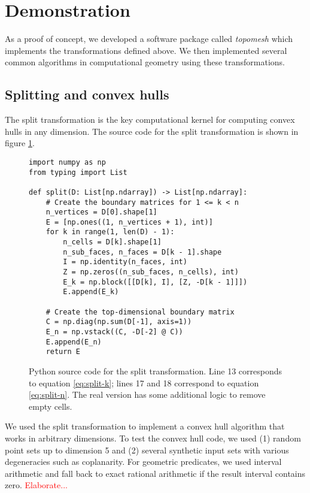 \documentclass[twocolumn]{article}
\begin{document}
\section{Demonstration}

As a proof of concept, we developed a software package called \emph{topomesh} which implements the transformations defined above.
We then implemented several common algorithms in computational geometry using these transformations.

\subsection{Splitting and convex hulls}

The split transformation is the key computational kernel for computing convex hulls in any dimension.
The source code for the split transformation is shown in figure \ref{fig:split-source-code}.
\begin{figure}
    \begin{verbatim}
import numpy as np
from typing import List

def split(D: List[np.ndarray]) -> List[np.ndarray]:
    # Create the boundary matrices for 1 <= k < n
    n_vertices = D[0].shape[1]
    E = [np.ones((1, n_vertices + 1), int)]
    for k in range(1, len(D) - 1):
        n_cells = D[k].shape[1]
        n_sub_faces, n_faces = D[k - 1].shape
        I = np.identity(n_faces, int)
        Z = np.zeros((n_sub_faces, n_cells), int)
        E_k = np.block([[D[k], I], [Z, -D[k - 1]]])
        E.append(E_k)

    # Create the top-dimensional boundary matrix
    C = np.diag(np.sum(D[-1], axis=1))
    E_n = np.vstack((C, -D[-2] @ C))
    E.append(E_n)
    return E
    \end{verbatim}
    \caption{Python source code for the split transformation.
    Line 13 corresponds to equation \eqref{eq:split-k}; lines 17 and 18 correspond to equation \eqref{eq:split-n}.
    The real version has some additional logic to remove empty cells.}
    \label{fig:split-source-code}
\end{figure}

We used the split transformation to implement a convex hull algorithm that works in arbitrary dimensions.
To test the convex hull code, we used (1) random point sets up to dimension 5 and (2) several synthetic input sets with various degeneracies such as coplanarity.
For geometric predicates, we used interval arithmetic and fall back to exact rational arithmetic if the result interval contains zero.
\textcolor{red}{Elaborate...}
\end{document}
